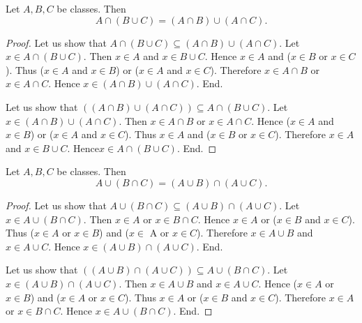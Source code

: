 \documentclass[10pt]{article}
\begin{document}
  \begin{forthel}
    \begin{proposition}
      Let $A, B, C$ be classes.
      Then \[ A \cap (B \cup C) = (A \cap B) \cup (A \cap C). \]
    \end{proposition}
    \begin{proof}
      Let us show that $A \cap (B \cup C) \subseteq (A \cap B) \cup (A \cap C)$.
        Let $x \in A \cap (B \cup C)$.
        Then $x \in A$ and $x \in B \cup C$.
        Hence $x \in A$ and ($x \in B$ or $x \in C$).
        Thus ($x \in A$ and $x \in B$) or ($x \in A$ and $x \in C$).
        Therefore $x \in A \cap B$ or $x \in A \cap C$.
        Hence $x \in (A \cap B) \cup (A \cap C)$.
      End.

      Let us show that $((A \cap B) \cup (A \cap C)) \subseteq A \cap (B \cup C)$. %
        Let $x \in (A \cap B) \cup (A \cap C)$.
        Then $x \in A \cap B$ or $x \in A \cap C$.
        Hence ($x \in A$ and $x \in B$) or ($x \in A$ and $x \in C$).
        Thus $x \in A$ and ($x \in B$ or $x \in C$).
        Therefore $x \in A$ and $x \in B \cup C$.
        Hence$ x \in A \cap (B \cup C)$.
      End.
    \end{proof}
  \end{forthel}

  \begin{forthel}
    \begin{proposition}
      Let $A, B, C$ be classes.
      Then \[ A \cup (B \cap C) = (A \cup B) \cap (A \cup C). \]
    \end{proposition}
    \begin{proof}
      Let us show that $A \cup (B \cap C) \subseteq (A \cup B) \cap (A \cup C)$.
        Let $x \in A \cup (B \cap C)$.
        Then $x \in A$ or $x \in B \cap C$.
        Hence $x \in A$ or ($x \in B$ and $x \in C$).
        Thus ($x \in A$ or $x \in B$) and ($x \in$ A or $x \in C$).
        Therefore $x \in A \cup B$ and $x \in A \cup C$.
        Hence $x \in (A \cup B) \cap (A \cup C)$.
      End.

      Let us show that $((A \cup B) \cap (A \cup C)) \subseteq A \cup (B \cap C)$. %
        Let $x \in (A \cup B) \cap (A \cup C)$.
        Then $x \in A \cup B$ and $x \in A \cup C$.
        Hence ($x \in A$ or $x \in B$) and ($x \in A$ or $x \in C$).
        Thus $x \in A$ or ($x \in B$ and $x \in C$).
        Therefore $x \in A$ or $x \in B \cap C$.
        Hence $x \in A \cup (B \cap C)$.
      End.
    \end{proof}
  \end{forthel}
\end{document}
